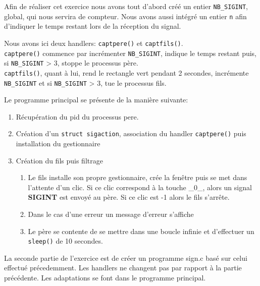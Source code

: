 \medskip

Afin de réaliser cet exercice nous avons tout d'abord créé un entier \lstinline{NB_SIGINT}, global, qui nous servira de compteur. Nous avons aussi intégré un entier \lstinline{n} afin d'indiquer le temps restant lors de la réception du signal.

\medskip

Nous avons ici deux handlers: \lstinline{captpere()} et \lstinline{captfils()}.\\
\lstinline{captpere()} commence par incrémenter \lstinline{NB_SIGINT}, indique le temps restant puis, si \lstinline{NB_SIGINT} > 3, stoppe le processus père.\\
\lstinline{captfils()}, quant à lui, rend le rectangle vert pendant 2 secondes, incrémente \lstinline{NB_SIGINT} et si \lstinline{NB_SIGINT} > 3, tue le processus fils.

\medskip

Le programme principal se présente de la manière suivante:
\begin{enumerate}
  \item Récupération du pid du processus pere.
  \item Création d'un \lstinline{struct sigaction}, association du handler \lstinline{captpere()} puis installation du gestionnaire
  \item Création du fils puis filtrage
  \begin{enumerate}
    \item Le fils installe son propre gestionnaire, crée la fenêtre puis se met dans l'attente d'un clic. Si ce clic correspond à la touche \_0\_, alors un signal \textbf{SIGINT} est envoyé au père. Si ce clic est -1
alors le fils s'arrête.
    \item Dans le cas d'une erreur un message d'erreur s'affiche
    \item Le père se contente de se mettre dans une boucle infinie et d'effectuer un \lstinline{sleep()} de 10 secondes.
  \end{enumerate}
\end{enumerate}

La seconde partie de l'exercice est de créer un programme sign.c basé sur celui effectué précedemment. Les handlers ne changent pas par rapport à la partie précédente. Les adaptations se font dans le programme principal.

\medskip

